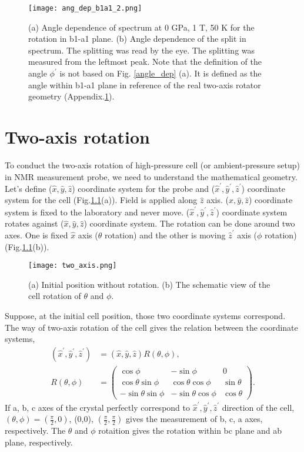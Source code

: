 \begin{figure}
  \centering
  \texttt{[image: ang\_dep\_b1a1\_2.png]}
  \caption{(a) Angle dependence of spectrum at 0 GPa, 1 T, 50 K for the rotation in b1-a1 plane.
  (b) Angle dependence of the split in spectrum.
  The splitting was read by the eye.
  The splitting was measured from the leftmost peak.
  Note that the definition of the angle $\phi^\prime$ is not based on Fig. \ref{angle_dep} (a).
  It is defined as the angle within b1-a1 plane in reference of the real two-axis rotator geometry (Appendix.\ref{two-axis}).}
  \label{b1a1}
\end{figure}

\chapter{Two-axis rotation}
\label{two-axis}
To conduct the two-axis rotation of high-pressure cell (or ambient-pressure setup) in NMR measurement probe, we need to understand the mathematical geometry.
Let's define ($\hat{x}, \hat{y}, \hat{z}$) coordinate system for the probe and ($\hat{x}^\prime, \hat{y}^\prime, \hat{z}^\prime$) coordinate system for the cell
(Fig.\ref{two_axis}(a)).
Field is applied along $\hat{z}$ axis.
($\hat{x}, \hat{y}, \hat{z}$) coordinate system is fixed to the laboratory and never move.
($\hat{x}^\prime, \hat{y}^\prime, \hat{z}^\prime$) coordinate system rotates against ($\hat{x}, \hat{y}, \hat{z}$) coordinate system.
The rotation can be done around two axes.
One is fixed $\hat{x}$ axis ($\theta$ rotation) and  the other is moving $\hat{z}^\prime$ axis ($\phi$ rotation) (Fig.\ref{two_axis}(b)).
\begin{figure}
  \centering
  \texttt{[image: two\_axis.png]}
  \caption{(a) Initial position without rotation.
  (b) The schematic view of the cell rotation of $\theta$ and $\phi$.}
  \label{two_axis}
\end{figure}
Suppose, at the initial cell position, those two coordinate systems correspond.
The way of two-axis rotation of the cell gives the relation between the coordinate systems,
\begin{align}
\label{coordinates}
(\hat{x}^\prime, \hat{y}^\prime, \hat{z}^\prime) &= (\hat{x}, \hat{y}, \hat{z}) R(\theta, \phi),\\
R(\theta, \phi) &=
\left(
\begin{array}{ccc}
\cos\phi & -\sin\phi & 0 \\
\cos\theta\sin\phi & \cos\theta\cos\phi & \sin\theta \\
-\sin\theta\sin\phi & -\sin\theta\cos\phi & \cos\theta
\end{array}
\right).
\end{align}
If a, b, c axes of the crystal perfectly correspond to $\hat{x}^\prime, \hat{y}^\prime, \hat{z}^\prime$ direction of the cell, $(\theta,\phi) = (\frac{\pi}{2},0)$,
(0,0), $(\frac{\pi}{2}, \frac{\pi}{2})$ gives the measurement of b, c, a axes, respectively.
The $\theta$ and $\phi$ rotaition gives the rotation within bc plane and ab plane, respectively.

